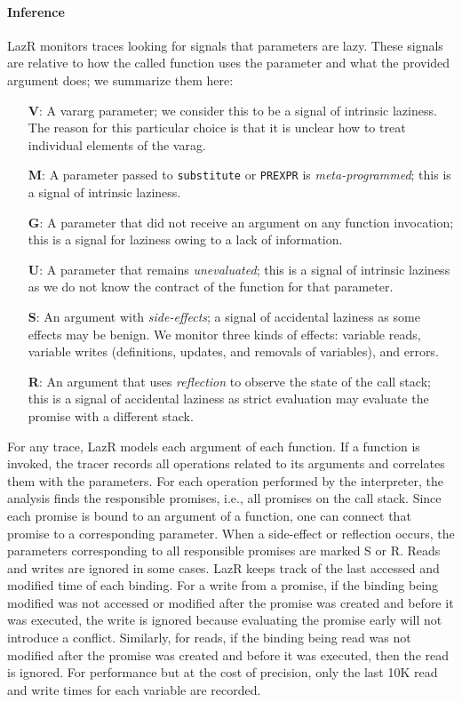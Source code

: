 \documentclass[review,screen,acmsmall]{acmart}
\renewcommand{\c}[1]{\lstinline |#1|\xspace}
\newcommand{\lazr}{{\sf LazR}\xspace}
\begin{document}
\paragraph{Inference}
\lazr monitors traces looking for signals that parameters are lazy. These
signals are relative to how the called function uses the parameter and what the
provided argument does; we summarize them here:
\begin{itemize}
\item[{\bf V}:] A vararg parameter; we consider this to be a signal of intrinsic
  laziness. The reason for this particular choice is that it is unclear how to
  treat individual elements of the varag.
\item[{\bf M}:] A parameter passed to \c{substitute} or \c{PREXPR} is
  \emph{meta-programmed}; this is a signal of intrinsic laziness.
\item[{\bf G}:] A parameter that did not receive an argument on any function
  invocation; this is a signal for laziness owing to a lack of information.
\item[{\bf U}:] A parameter that remains \emph{unevaluated}; this is a
  signal of intrinsic laziness as we do not know the contract of the function
  for that parameter.
\item [{\bf S}:] An argument with \emph{side-effects}; a signal of
  accidental laziness as some effects may be benign. We monitor three kinds of
  effects: variable reads, variable writes (definitions, updates, and removals
  of variables), and errors.
\item[{\bf R}:] An argument that uses \emph{reflection} to observe the state of
  the call stack; this is a signal of accidental laziness as strict evaluation
  may evaluate the promise with a different stack.
\end{itemize}

For any trace, \lazr models each argument of each function. If a function is
invoked, the tracer records all operations related to its arguments and
correlates them with the parameters. For each operation performed by the
interpreter, the analysis finds the responsible promises, i.e., all promises on
the call stack. Since each promise is bound to an argument of a function, one
can connect that promise to a corresponding parameter. When a side-effect or
reflection occurs, the parameters corresponding to all responsible promises are
marked S or R. Reads and writes are ignored in some cases. \lazr keeps track of
the last accessed and modified time of each binding. For a write from a promise,
if the binding being modified was not accessed or modified after the promise was
created and before it was executed, the write is ignored because evaluating the
promise early will not introduce a conflict. Similarly, for reads, if the
binding being read was not modified after the promise was created and before it
was executed, then the read is ignored. For performance but at the cost of
precision, only the last 10K read and write times for each variable are
recorded.
\end{document}
